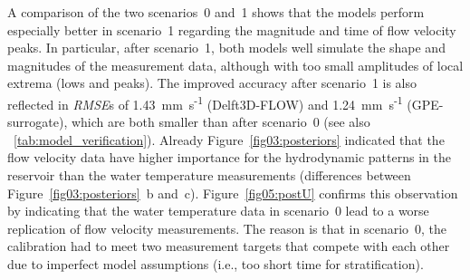 \documentclass[draft,linenumbers,onecolumn]{agujournal2019} %
\begin{document}
A comparison of the two scenarios~0 and~1 shows that the models perform especially better in scenario~1 regarding the magnitude and time of flow velocity peaks. In particular, after scenario~1, both models well simulate the shape and magnitudes of the measurement data, although with too small amplitudes of local extrema (lows and peaks). The improved accuracy after scenario~1 is also reflected in \textit{RMSE}s of 1.43~mm~s\textsuperscript{-1} (Delft3D-FLOW) and 1.24~mm~s\textsuperscript{-1} (GPE-surrogate), which are both smaller than after scenario~0 (see also \tablename{~\ref{tab:model_verification}}). Already Figure~\ref{fig03:posteriors} indicated that the flow velocity data have higher importance for the hydrodynamic patterns in the reservoir than the water temperature measurements (differences between Figure~\ref{fig03:posteriors}~b and~c). Figure~\ref{fig05:postU} confirms this observation by indicating that the water temperature data in scenario~0 lead to a worse replication of flow velocity measurements. The reason is that in scenario~0, the calibration had to meet two measurement targets that compete with each other due to imperfect model assumptions (i.e., too short time for stratification).
\end{document}
